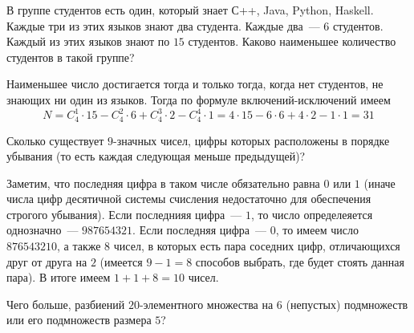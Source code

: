 \begin{Exercise}[counter=SecExercise]
    \noindent
    В группе студентов есть один, который знает С++, Java, Python, Haskell.
    Каждые три из этих языков знают два студента.
    Каждые два~--- $ 6 $ студентов.
    Каждый из этих языков знают по $ 15 $ студентов.
    Каково наименьшее количество студентов в такой группе?
\end{Exercise}

\begin{Answer}
    \noindent
    Наименьшее число достигается тогда и только тогда, когда нет студентов, не знающих ни один из языков.
    Тогда по формуле включений-исключений имеем
    \[
        N = C_4^1 \cdot 15 - C_4^2 \cdot 6 + C_4^3 \cdot 2 - C_4^4 \cdot 1 = 4 \cdot 15 - 6 \cdot 6 + 4 \cdot 2 - 1 \cdot 1 = 31
    \]
\end{Answer}


\begin{Exercise}[counter=SecExercise, label={exercise:combinatorics:monotonic_digits}]
    \noindent
    Сколько существует $ 9 $-значных чисел,
    цифры которых расположены в порядке убывания (то есть каждая следующая меньше предыдущей)?
\end{Exercise}

\begin{Answer}
    \noindent
    Заметим, что последняя цифра в таком числе обязательно равна $ 0 $ или $ 1 $
    (иначе числа цифр десятичной системы счисления недостаточно для обеспечения строгого убывания).
    Если последнияя цифра~--- $ 1 $,
    то число определеяется однозначно~--- $ 987654321 $.
    Если последняя цифра~--- $ 0 $,
    то имеем число $ 876543210 $,
    а также $ 8 $ чисел, в которых есть пара соседних цифр, отличающихся друг от друга на $ 2 $
    (имеется $ 9 - 1 = 8 $ способов выбрать, где будет стоять данная пара).
    В итоге имеем $ 1 + 1 + 8 = 10 $ чисел.
\end{Answer}


\begin{Exercise}[counter=SecExercise, label={exercise:combinatorics:subsets_decomposition}]
    \noindent
    Чего больше, разбиений $ 20 $-элементного множества на $ 6 $ (непустых) подмножеств или его подмножеств размера $ 5 $?
\end{Exercise}


